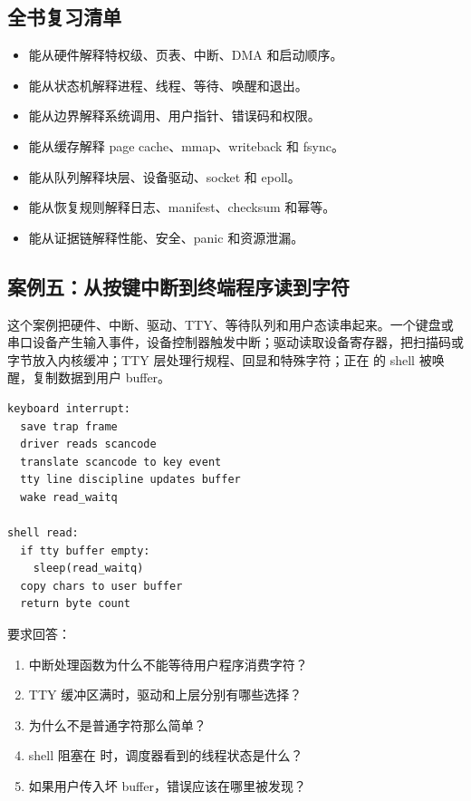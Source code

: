 \subsection{全书复习清单}

\begin{itemize}
\tightlist
\item 能从硬件解释特权级、页表、中断、DMA 和启动顺序。
\item 能从状态机解释进程、线程、等待、唤醒和退出。
\item 能从边界解释系统调用、用户指针、错误码和权限。
\item 能从缓存解释 page cache、mmap、writeback 和 fsync。
\item 能从队列解释块层、设备驱动、socket 和 epoll。
\item 能从恢复规则解释日志、manifest、checksum 和幂等。
\item 能从证据链解释性能、安全、panic 和资源泄漏。
\end{itemize}

\subsection{案例五：从按键中断到终端程序读到字符}

这个案例把硬件、中断、驱动、TTY、等待队列和用户态读串起来。一个键盘或串口设备产生输入事件，设备控制器触发中断；驱动读取设备寄存器，把扫描码或字节放入内核缓冲；TTY 层处理行规程、回显和特殊字符；正在  的 shell 被唤醒，复制数据到用户 buffer。

\begin{lstlisting}
keyboard interrupt:
  save trap frame
  driver reads scancode
  translate scancode to key event
  tty line discipline updates buffer
  wake read_waitq

shell read:
  if tty buffer empty:
    sleep(read_waitq)
  copy chars to user buffer
  return byte count
\end{lstlisting}

要求回答：

\begin{enumerate}
\tightlist
\item 中断处理函数为什么不能等待用户程序消费字符？
\item TTY 缓冲区满时，驱动和上层分别有哪些选择？
\item {} 为什么不是普通字符那么简单？
\item shell 阻塞在  时，调度器看到的线程状态是什么？
\item 如果用户传入坏 buffer，错误应该在哪里被发现？
\end{enumerate}

